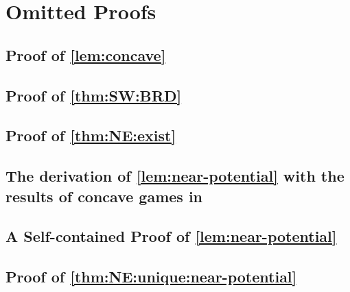 \section{Omitted Proofs}
\label{app:omitted-prf}

\subsection{Proof of \texorpdfstring{\cref{lem:concave}}{}}
\lemConcave*


\subsection{Proof of \texorpdfstring{\cref{thm:SW:BRD}}{}}
\thmSWBRD*


% 

\subsection{Proof of \texorpdfstring{\cref{thm:NE:exist}}{}}
\thmNEExist*


\subsection{The derivation of \texorpdfstring{\cref{lem:near-potential}}{} with the results of concave games in \texorpdfstring{\citet{concave_game-initial:rosen1965existence}}{}}
\lemNearPotential*


\subsection{A Self-contained Proof of \texorpdfstring{\cref{lem:near-potential}}{}}


\subsection{Proof of \texorpdfstring{\cref{thm:NE:unique:near-potential}}{}}
\thmNENearPotential*


